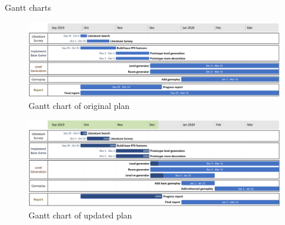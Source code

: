 \documentclass[final]{cmpreport}
\begin{document}
\begin{section}{Gantt charts}

\begin{figure}[H]
    \centering
    \includegraphics[angle=90,width=\textwidth,height=0.85\textheight,keepaspectratio]{img/gantt-original2.png}
    \caption{Gantt chart of original plan}
    \label{fig:gantt1}
\end{figure}

\begin{figure}[H]
    \centering
    \includegraphics[angle=90,width=\textwidth,height=0.85\textheight,keepaspectratio]{img/gantt-updated2.png}
    \caption{Gantt chart of updated plan}
    \label{fig:gantt2}
\end{figure}

\end{section}
\end{document}
